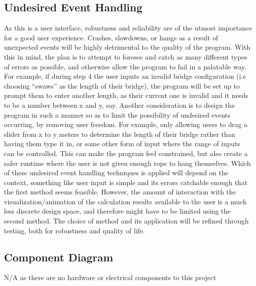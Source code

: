 \documentclass[12pt, titlepage]{article}
\begin{document}
\subsection{Undesired Event Handling}
As this is a user interface, robustness and reliability are of the utmost importance for a good user experience. Crashes, slowdowns, or hangs as a result of unexpected events will be highly detrimental to the quality of the program. With this in mind, the plan is to attempt to foresee and catch as many different types of errors as possible, and otherwise allow the program to fail in a palatable way. For example, if during step 4 the user inputs an invalid bridge configuration (i.e choosing “swaws” as the length of their bridge), the program will be set up to prompt them to enter another length, as their current one is invalid and it needs to be a number between x and y, say.
Another consideration is to design the program in such a manner so as to limit the possibility of undesired events occurring, by removing user freedom. For example, only allowing users to drag a slider from x to y meters to determine the length of their bridge rather than having them type it in, or some other form of input where the range of inputs can be controlled. This can make the program feel constrained, but also create a safer runtime where the user is not given enough rope to hang themselves.
Which of these undesired event handling techniques is applied will depend on the context, something like user input is simple and its errors catchable enough that the first method seems feasible. However, the amount of interaction with the visualization/animation of the calculation results available to the user is a much less discrete design space, and therefore might have to be limited using the second method. The choice of method and its application will be refined through testing, both for robustness and quality of life.
\subsection{Component Diagram}
N/A as there are no hardware or electrical components to this project

\newpage
\end{document}
